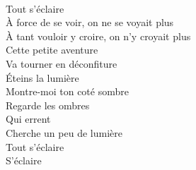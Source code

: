 \\
Tout s'éclaire \\
À force de se voir, on ne se voyait plus \\
À tant vouloir y croire, on n'y croyait plus \\
Cette petite aventure \\
Va tourner en déconfiture \\
Éteins la lumière \\
Montre-moi ton coté sombre \\
Regarde les ombres \\
Qui errent \\
Cherche un peu de lumière \\
Tout s'éclaire \\
S'éclaire \\
